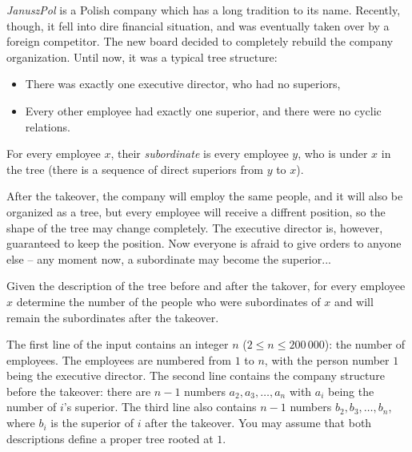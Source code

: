 





\textit{JanuszPol} is a Polish company which has a long tradition to its name. Recently, though, it fell into dire financial situation, and was eventually taken over by a foreign competitor. The new board decided to completely rebuild the company organization. Until now, it was a typical tree structure:

\begin{itemize}
 \item There was exactly one executive director, who had no superiors,
 \item Every other employee had exactly one superior, and there were no cyclic relations.
\end{itemize}

For every employee $x$, their \textit{subordinate} is every employee $y$, who is under $x$ in the tree (there is a sequence of direct superiors from $y$ to $x$).

After the takeover, the company will employ the same people, and it will also be organized as a tree, but every employee will receive a diffrent position, so the shape of the tree may change completely. The executive director is, however, guaranteed to keep the position. Now everyone is afraid to give orders to anyone else -- any moment now, a subordinate may become the superior...


Given the description of the tree before and after the takover, for every employee $x$ determine the number of the people who were subordinates of $x$ and will remain the subordinates after the takeover.


The first line of the input contains an integer $n$ ($2 \leq n \leq 200\,000$): the number of employees. The employees are numbered from $1$ to $n$, with the person number $1$ being the executive director. The second line contains the company structure before the takeover: there are $n-1$ numbers $a_2, a_3, \ldots, a_n$ with $a_i$ being the number of $i$'s superior. The third line also contains $n-1$ numbers $b_2, b_3, \ldots, b_n$, where $b_i$ is the superior of $i$ after the takeover. You may assume that both descriptions define a proper tree rooted at $1$.


